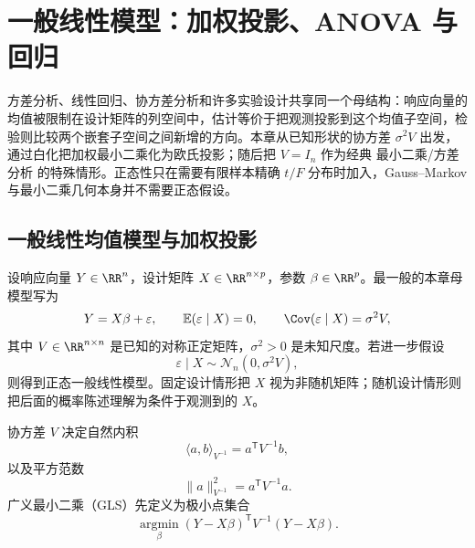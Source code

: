 \chapter{一般线性模型：加权投影、ANOVA 与回归}\label{chap:math-stat-linear-models}

方差分析、线性回归、协方差分析和许多实验设计共享同一个母结构：响应向量的均值被限制在设计矩阵的列空间中，估计等价于把观测投影到这个均值子空间，检验则比较两个嵌套子空间之间新增的方向。本章从已知形状的协方差 $\sigma^2V$ 出发，通过白化把加权最小二乘化为欧氏投影；随后把 $V=I_n$ 作为经典 最小二乘/方差分析 的特殊情形。正态性只在需要有限样本精确 $t/F$ 分布时加入，Gauss--Markov 与最小二乘几何本身并不需要正态假设。

\section{一般线性均值模型与加权投影}\label{sec:math-stat-general-linear-model}



\begin{definition}[线性均值模型与已知协方差形状]
设响应向量 $Y\in\RR^n$，设计矩阵 $X\in\RR^{n\times p}$，参数 $\beta\in\RR^p$。最一般的本章母模型写为
\begin{equation*}Y=X\beta+\varepsilon,
 \qquad
 \mathbb E(\varepsilon\mid X)=0,
 \qquad
 \Cov(\varepsilon\mid X)=\sigma^2V,
\end{equation*}
其中 $V\in\RR^{n\times n}$ 是已知的对称正定矩阵，$\sigma^2>0$ 是未知尺度。若进一步假设
\[
 \varepsilon\mid X\sim\mathcal N_n(0,\sigma^2V),
\]
则得到正态一般线性模型。固定设计情形把 $X$ 视为非随机矩阵；随机设计情形则把后面的概率陈述理解为条件于观测到的 $X$。
\end{definition}

\begin{definition}[加权内积与广义最小二乘]
协方差 $V$ 决定自然内积
\[
 \langle a,b\rangle_{V^{-1}}
 =a^{\mathsf T}V^{-1}b,
\]
以及平方范数
\[
 \|a\|_{V^{-1}}^2
 =a^{\mathsf T}V^{-1}a.
\]
广义最小二乘（GLS）先定义为极小点集合
\[
 \operatorname*{argmin}_\beta
 (Y-X\beta)^{\mathsf T}V^{-1}(Y-X\beta).
\]
\end{definition}

